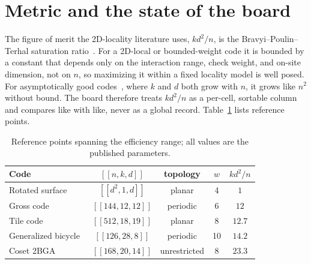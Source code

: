 \documentclass[11pt]{article}
\newcommand{\eff}{kd^2/n}
\begin{document}
\section{Metric and the state of the board}

The figure of merit the 2D-locality literature uses, $\eff$, is the
Bravyi--Poulin--Terhal saturation ratio~\cite{bravyi2010tradeoffs}. For a
2D-local or bounded-weight code it
is bounded by a constant that depends only on the interaction range, check
weight, and on-site dimension, not on $n$, so maximizing it within a fixed
locality model is well posed. For asymptotically good
codes~\cite{panteleev2022asymptotically}, where $k$ and $d$ both grow with $n$,
it grows like $n^2$ without bound. The board therefore treats
$\eff$ as a per-cell, sortable column and compares like with like, never as a
global record. Table~\ref{tab:ref} lists reference points.

\begin{table}[h]
\centering
\begin{tabular}{lcccc}
\toprule
Code & $[[n,k,d]]$ & topology & $w$ & $\eff$\\
\midrule
Rotated surface~\cite{kitaev2003fault}          & $[[d^2,1,d]]$   & planar       & 4  & $1$\\
Gross code~\cite{bravyi2024high}                & $[[144,12,12]]$ & periodic     & 6  & $12$\\
Tile code~\cite{steffan2025tile}                & $[[512,18,19]]$ & planar       & 8  & $12.7$\\
Generalized bicycle~\cite{panteleev2021degenerate} & $[[126,28,8]]$  & periodic  & 10 & $14.2$\\
Coset 2BGA~\cite{aydin2026breaking}             & $[[168,20,14]]$ & unrestricted & 8  & $23.3$\\
\bottomrule
\end{tabular}
\caption{Reference points spanning the efficiency range; all values are the
published parameters.}
\label{tab:ref}
\end{table}
\end{document}
